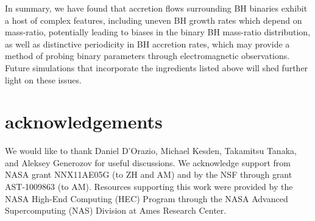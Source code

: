 \documentclass[apj]{emulateapj}
\begin{document}
In summary, we have found that accretion flows surrounding BH binaries exhibit a host of complex features, including uneven BH growth rates which depend on mass-ratio, potentially leading to biases in the binary BH mass-ratio distribution, as well as distinctive periodicity in BH accretion rates, which may provide a method of probing binary parameters through electromagnetic observations. Future simulations that incorporate the ingredients listed above will shed further light on these issues.

\section{acknowledgements}
We would like to thank Daniel D'Orazio, Michael Kesden, Takamitsu Tanaka, and Aleksey Generozov for useful discussions. We acknowledge support from NASA grant NNX11AE05G (to ZH and AM) and by the NSF through grant AST-1009863 (to AM). Resources supporting this work were provided by the NASA High-End Computing (HEC) Program through the NASA Advanced Supercomputing (NAS) Division at Ames Research Center.



\end{document}
